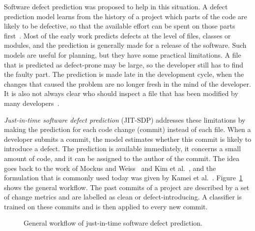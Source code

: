 \documentclass[12pt,a4paper,oneside]{report}
\begin{document}
Software defect prediction was proposed to help in this situation. A defect
prediction model learns from the history of a project which parts of the code
are likely to be defective, so that the available effort can be spent on those
parts first~\cite{hall2012slr,rathore2019study}. Most of the early work predicts
defects at the level of files, classes or modules, and the prediction is
generally made for a release of the software. Such models are useful for
planning, but they have some practical limitations. A file that is predicted
as defect-prone may be large, so the developer still has to find the faulty
part. The prediction is made late in the development cycle, when the changes
that caused the problem are no longer fresh in the mind of the developer.
It is also not always clear who should inspect a file that has been modified by
many developers~\cite{kamei2013jit}.

\emph{Just-in-time software defect prediction} (JIT-SDP) addresses these
limitations by making the prediction for each code change (commit) instead of
each file. When a developer submits a commit, the model estimates whether this
commit is likely to introduce a defect. The prediction is available
immediately, it concerns a small amount of code, and it can be assigned to the
author of the commit. The idea goes back to the work of Mockus and
Weiss~\cite{mockus2000risk} and Kim et al.~\cite{kim2008classifying}, and the
formulation that is commonly used today was given by Kamei et
al.~\cite{kamei2013jit}. Figure~\ref{fig:workflow} shows the general workflow.
The past commits of a project are described by a set of change metrics and are
labelled as clean or defect-introducing. A classifier is trained on these
commits and is then applied to every new commit.

\begin{figure}[htbp]
\centering
{}
\caption{General workflow of just-in-time software defect prediction.}
\label{fig:workflow}
\end{figure}
\end{document}
